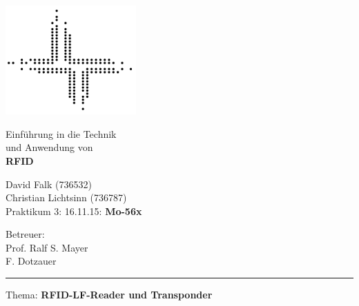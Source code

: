 \documentclass[paper=a4,fontsize=11pt,headsepline,footsepline,parskip=half]{scrartcl}
\begin{document}
\begin{titlepage}

\begin{minipage}[c]{5cm}
\includegraphics[width=5cm]{../logofbi}
\end{minipage}
\hfill
\begin{minipage}[c]{10cm}
\begin{flushright}
\Large Einführung in die Technik\\und Anwendung von\\
\LARGE \textbf{RFID}
\end{flushright}
\end{minipage}

\vspace*{1cm}

\begin{minipage}[c]{9cm}
\begin{flushleft}
\large David Falk (736532)\\Christian Lichtsinn (736787)\\Praktikum 3: 16.11.15: \textbf{Mo-56x}
\end{flushleft}
\end{minipage}
\hfill
\begin{minipage}[c]{7cm}
\begin{flushright}
\large Betreuer:\\Prof. Ralf S. Mayer\\F. Dotzauer
\end{flushright}
\end{minipage}

\vspace*{1cm}

\begingroup
  \setlength{\parskip}{0pt}%
  \setlength{\parindent}{0pt}%
  \setlength{\parfillskip}{0pt plus 1fil}%
  \par\rule{\linewidth}{1.5pt}\par
\endgroup

\vspace*{1cm}

\noindent
\large{Thema: \textbf{RFID-LF-Reader und Transponder}}

\end{titlepage}
\end{document}
